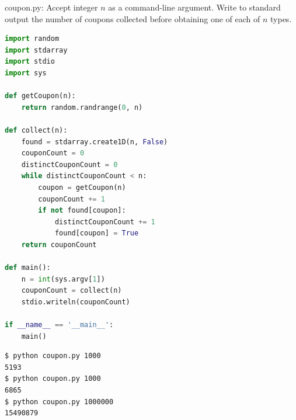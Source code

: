 \documentclass[8pt,a4paper,compress]{beamer}
\begin{document}
\begin{frame}[fragile]
\pause

\begin{framed}
\tiny coupon.py: Accept integer $n$ as a command-line argument. Write to standard output the number of coupons collected before obtaining one of each of $n$ types.
\end{framed}

\begin{lstlisting}[language=Python]
import random
import stdarray
import stdio
import sys

def getCoupon(n):
    return random.randrange(0, n)

def collect(n):
    found = stdarray.create1D(n, False)
    couponCount = 0
    distinctCouponCount = 0
    while distinctCouponCount < n:
        coupon = getCoupon(n)
        couponCount += 1
        if not found[coupon]:
            distinctCouponCount += 1
            found[coupon] = True
    return couponCount

def main():
    n = int(sys.argv[1])
    couponCount = collect(n)
    stdio.writeln(couponCount)

if __name__ == '__main__':
    main()
\end{lstlisting}
\end{frame}

\begin{frame}[fragile]
\pause

\begin{lstlisting}[language={}]
$ python coupon.py 1000
5193
$ python coupon.py 1000
6865
$ python coupon.py 1000000
15490879
\end{lstlisting}
\end{frame}
\end{document}
